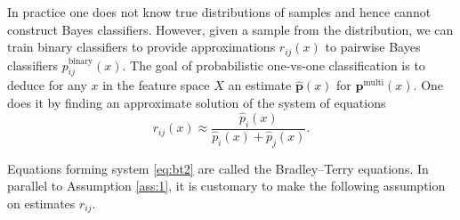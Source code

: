 \documentclass[pdflatex, sn-basic]{sn-jnl}%
\theoremstyle{thmstyleone}%
\theoremstyle{thmstyletwo}%
\theoremstyle{thmstylethree}%
\begin{document}
In practice one does not  know true distributions of samples and hence cannot 
construct Bayes classifiers. However, given a sample from the distribution, 
we can train binary classifiers to provide approximations $r_{ij}(x)$ to 
pairwise Bayes classifiers $p_{ij}^\textrm{binary}(x)$. The goal of probabilistic
one-vs-one classification is to deduce for any $x$ in the feature space $X$ an 
estimate $\hat{\boldsymbol{p}}(x)$ for $\boldsymbol{p}^\textrm{multi}(x)$. 
One does it by finding an approximate solution of the system of equations
%
%
%
%
%
%
%
%
\begin{equation}
	{r}_{ij}(x) \approx \frac {\hat p_i(x)}{\hat p_i(x) + \hat p_j(x)}. \label{eq:bt2}
\end{equation}


Equations forming system \eqref{eq:bt2} are called the Bradley--Terry equations. In parallel to Assumption \ref{ass:1}, it is customary to make the following assumption on estimates $r_{ij}$.
\end{document}
